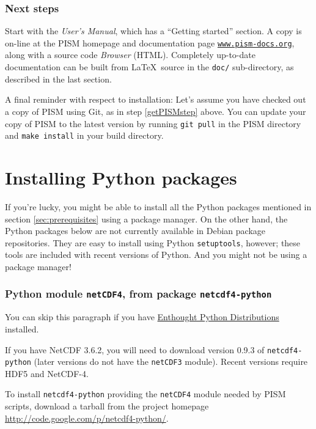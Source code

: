 \documentclass[titlepage,letterpaper,final]{scrartcl}
\begin{document}
\subsubsection*{Next steps}

Start with the \emph{User's Manual}, which has a ``Getting started'' section. A
copy is on-line at the PISM homepage and documentation page
\href{http://www.pism-docs.org/}{\texttt{www.pism-docs.org}}, along with a
source code \emph{Browser} (HTML). Completely up-to-date documentation can be
built from \LaTeX~source in the \texttt{doc/} sub-directory, as described in
the last section.

A final reminder with respect to installation: Let's assume you have checked
out a copy of PISM using Git, as in step \ref{getPISMstep} above. You can
update your copy of PISM to the latest version by running \texttt{git pull} in
the PISM directory and \texttt{make install} in your build directory.


\section{Installing Python packages}
\label{sec:python}

If you're lucky, you might be able to install all the Python packages mentioned
in section \ref{sec:prerequisites} using a package manager. On the other hand,
the Python packages below are not currently available in Debian package
repositories. They are easy to install using Python \texttt{setuptools},
however; these tools are included with recent versions of Python. And you might
not be using a package manager!

\subsubsection*{Python module \texttt{netCDF4}, from package
  \texttt{netcdf4-python}}

You can skip this paragraph if you have
\href{http://www.enthought.com/}{Enthought Python Distributions} installed.

If you have NetCDF 3.6.2, you will need to download version 0.9.3 of
\texttt{netcdf4-python} (later versions do not have the \texttt{netCDF3}
module). Recent versions require HDF5 and NetCDF-4.

To install \texttt{netcdf4-python} providing the \texttt{netCDF4} module needed
by PISM scripts, download a tarball from the project homepage
\url{http://code.google.com/p/netcdf4-python/}.
\end{document}
